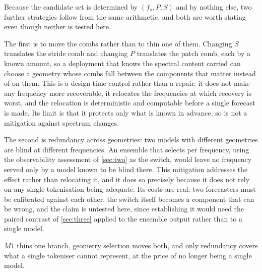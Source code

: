 Because the candidate set is determined by $(f_s,P,S)$ and by nothing else, two further strategies follow from the same arithmetic, and both are worth stating even though neither is tested here.

The first is to move the combs rather than to thin one of them. Changing $S$ translates the stride comb and changing $P$ translates the patch comb, each by a known amount, so a deployment that knows the spectral content carried can choose a geometry whose combs fall between the components that matter instead of on them. This is a design-time control rather than a repair: it does not make any frequency more recoverable, it relocates the frequencies at which recovery is worst, and the relocation is deterministic and computable before a single forecast is made. Its limit is that it protects only what is known in advance, so is not a mitigation against spectrum changes.

The second is redundancy across geometries: two models with different geometries are blind at different frequencies. An ensemble that selects per frequency, using the observability assessment of \autoref{sec:two} as the switch, would leave no frequency served only by a model known to be blind there. This mitigation addresses the effect rather than relocating it, and it does so precisely because it does not rely on any single tokenisation being adequate. Its costs are real: two forecasters must be calibrated against each other, the switch itself becomes a component that can be wrong, and the claim is untested here, since establishing it would need the paired contrast of \autoref{sec:three} applied to the ensemble output rather than to a single model.

$M1$ thins one branch, geometry selection moves both, and only redundancy covers what a single tokeniser cannot represent, at the price of no longer being a single model.
